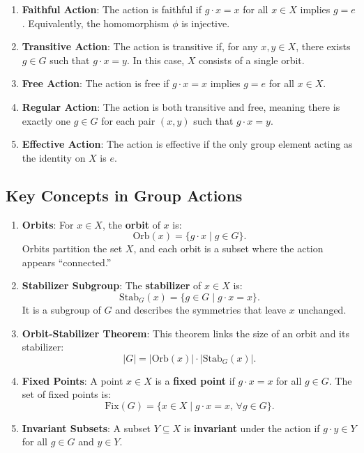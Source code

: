 \documentclass[11pt]{article}
\theoremstyle{definition}
\begin{document}
\begin{enumerate}
    \item \textbf{Faithful Action}: The action is faithful if \( g \cdot x = x \) for all \( x \in X \) implies \( g = e \). Equivalently, the homomorphism \( \phi \) is injective.
    
    \item \textbf{Transitive Action}: The action is transitive if, for any \( x, y \in X \), there exists \( g \in G \) such that \( g \cdot x = y \). In this case, \( X \) consists of a single orbit.
    
    \item \textbf{Free Action}: The action is free if \( g \cdot x = x \) implies \( g = e \) for all \( x \in X \).
    
    \item \textbf{Regular Action}: The action is both transitive and free, meaning there is exactly one \( g \in G \) for each pair \( (x, y) \) such that \( g \cdot x = y \).
    
    \item \textbf{Effective Action}: The action is effective if the only group element acting as the identity on \( X \) is \( e \).
\end{enumerate}

\subsection*{Key Concepts in Group Actions}

\begin{enumerate}
    \item \textbf{Orbits}:
    For \( x \in X \), the \textbf{orbit} of \( x \) is:
    \[
    \text{Orb}(x) = \{g \cdot x \mid g \in G\}.
    \]
    Orbits partition the set \( X \), and each orbit is a subset where the action appears ``connected.''

    \item \textbf{Stabilizer Subgroup}:
    The \textbf{stabilizer} of \( x \in X \) is:
    \[
    \text{Stab}_G(x) = \{g \in G \mid g \cdot x = x\}.
    \]
    It is a subgroup of \( G \) and describes the symmetries that leave \( x \) unchanged.

    \item \textbf{Orbit-Stabilizer Theorem}:
    This theorem links the size of an orbit and its stabilizer:
    \[
    |G| = |\text{Orb}(x)| \cdot |\text{Stab}_G(x)|.
    \]

    \item \textbf{Fixed Points}:
    A point \( x \in X \) is a \textbf{fixed point} if \( g \cdot x = x \) for all \( g \in G \). The set of fixed points is:
    \[
    \text{Fix}(G) = \{x \in X \mid g \cdot x = x, \, \forall g \in G\}.
    \]

    \item \textbf{Invariant Subsets}:
    A subset \( Y \subseteq X \) is \textbf{invariant} under the action if \( g \cdot y \in Y \) for all \( g \in G \) and \( y \in Y \).
\end{enumerate}
\end{document}
